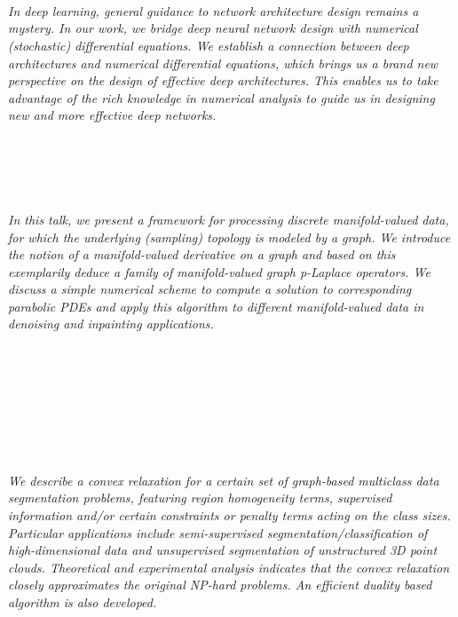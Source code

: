 \begin{multicols}{2}
        \\\\
\\
      \textit{In deep learning, general guidance to network architecture design remains a mystery. In our work, we bridge deep neural network design with numerical (stochastic) differential equations. We establish a connection between deep architectures and numerical differential equations, which brings us a brand new perspective on the design of effective deep architectures. This enables us to take advantage of the rich knowledge in numerical analysis to guide us in designing new and more effective deep networks. }\\
\\ 
        \\
        \\\\
\\
      \textit{In this talk, we present a framework for processing discrete manifold-valued data, for which the underlying (sampling) topology is modeled by a graph. We introduce the notion of a manifold-valued derivative on a graph and based on this exemplarily deduce a family of manifold-valued graph p-Laplace operators. We discuss a simple numerical scheme to compute a solution to corresponding parabolic PDEs and apply this algorithm to different manifold-valued data in denoising and inpainting applications.}\\
\\ 
        \\
        \\\\
        \\
        \\\\
\\
      \textit{We describe a convex relaxation for a certain set of graph-based multiclass data segmentation problems, featuring region homogeneity terms, supervised information and/or certain constraints or penalty terms acting on the class sizes. Particular applications include semi-supervised segmentation/classification of high-dimensional data and unsupervised segmentation of unstructured 3D point clouds. Theoretical and experimental analysis indicates that the convex relaxation closely approximates the original NP-hard problems. An efficient duality based algorithm is also developed.}\\

\end{multicols}
